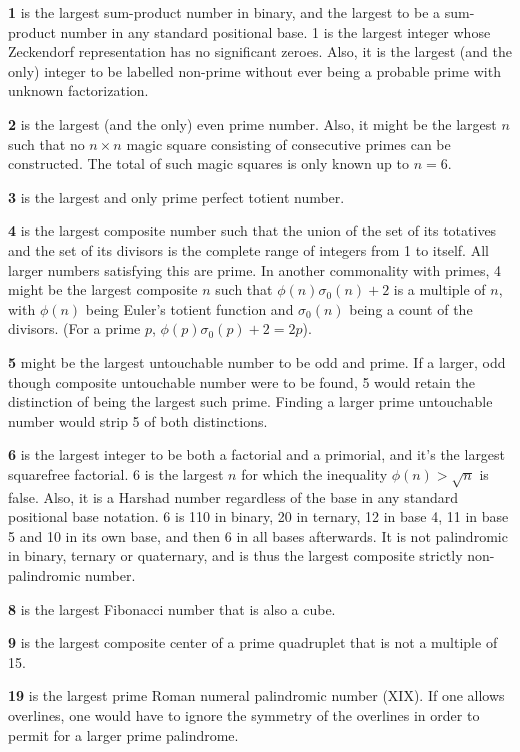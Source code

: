 \documentclass[12pt]{article}
\begin{document}
{\bf 1} is the largest sum-product number in binary, and the largest to be a sum-product number in any standard positional base. 1 is the largest integer whose Zeckendorf representation has no significant zeroes. Also, it is the largest (and the only) integer to be labelled non-prime without ever being a probable prime with unknown factorization.

{\bf 2} is the largest (and the only) even prime number. Also, it might be the largest $n$ such that no $n \times n$ magic square consisting of consecutive primes can be constructed. The total of such magic squares is only known up to $n = 6$.

{\bf 3} is the largest and only prime perfect totient number.

{\bf 4} is the largest composite number such that the union of the set of its totatives and the set of its divisors is the complete range of integers from 1 to itself. All larger numbers satisfying this  are prime. In another commonality with primes, 4 might be the largest composite $n$ such that $\phi(n)\sigma_0(n) + 2$ is a multiple of $n$, with $\phi(n)$ being Euler's totient function and $\sigma_0(n)$ being a count of the divisors. (For a prime $p$, $\phi(p)\sigma_0(p) + 2 = 2p$). 

{\bf 5} might be the largest untouchable number to be odd and prime. If a larger, odd though composite untouchable number were to be found, 5 would retain the distinction of being the largest such prime. Finding a larger prime untouchable number would strip 5 of both distinctions.

{\bf 6} is the largest integer to be both a factorial and a primorial, and it's the largest squarefree factorial. 6 is the largest $n$ for which the inequality $\phi(n) > \sqrt{n}$ is false. Also, it is a Harshad number regardless of the base in any standard positional base notation. 6 is 110 in binary, 20 in ternary, 12 in base 4, 11 in base 5 and 10 in its own base, and then 6 in all bases afterwards. It is not palindromic in binary, ternary or quaternary, and is thus the largest composite strictly non-palindromic number.

{\bf 8} is the largest Fibonacci number that is also a cube.

{\bf 9} is the largest composite center of a prime quadruplet that is not a multiple of 15.

{\bf 19} is the largest prime Roman numeral palindromic number (XIX). If one allows overlines, one would have to ignore the symmetry of the overlines in order to permit for a larger prime palindrome.
\end{document}

